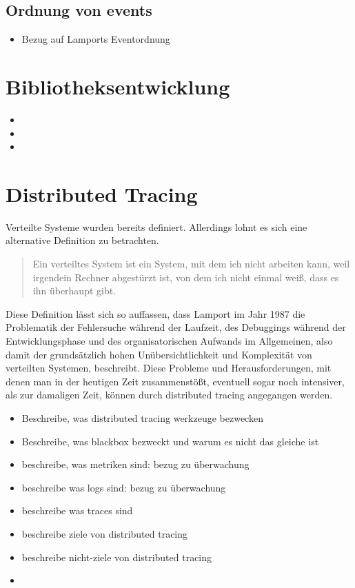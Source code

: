 \subsection{Ordnung von events}
\begin{itemize}
	\item Bezug auf Lamports Eventordnung
\end{itemize}
\section{Bibliotheksentwicklung}
\begin{itemize}
	\item 
	\item 
	\item
\end{itemize}

\section{Distributed Tracing}
Verteilte Systeme wurden bereits definiert. Allerdings lohnt es sich eine alternative Definition zu betrachten.

\begin{quote}
	Ein verteiltes System ist ein System, mit dem ich nicht arbeiten kann, weil irgendein Rechner abgestürzt ist, von dem ich nicht einmal weiß, dass es ihn überhaupt gibt.
\end{quote}


Diese Definition lässt sich so auffassen, dass Lamport im Jahr 1987 die Problematik der Fehlersuche während der Laufzeit, des Debuggings während der Entwicklungsphase und des organisatorischen Aufwands im Allgemeinen, also damit der grundsätzlich hohen Unübersichtlichkeit und Komplexität von verteilten Systemen, beschreibt. Diese Probleme und Herausforderungen, mit denen man in der heutigen Zeit zusammenstößt, eventuell sogar noch intensiver, als zur damaligen Zeit, können durch distributed tracing angegangen werden. 


\begin{itemize}
	\item Beschreibe, was distributed tracing werkzeuge bezwecken
	\item Beschreibe, was blackbox bezweckt und warum es nicht das gleiche ist
	\item beschreibe, was metriken sind: bezug zu überwachung
	\item beschreibe was logs sind: bezug zu überwachung
	\item beschreibe was traces sind
	\item beschreibe ziele von distributed tracing
	\item beschreibe nicht-ziele von distributed tracing
	\item 
\end{itemize}
 
 
